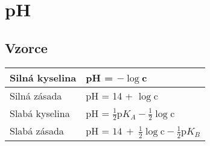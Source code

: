 \documentclass[12pt,a4paper,oneside]{article}
\begin{document}
\section{pH}
\subsection{Vzorce}

\begin{tabular}{|l|l|}
	\hline
	Silná kyselina & pH = $-\log$c \\\hline
	Silná zásada & pH = 14 + $\log$c \\\hline
	Slabá kyselina & pH = $\frac{1}{2}\textrm{p}K_A-\frac{1}{2}\log$c \\[1em] \hline
	Slabá zásada & pH = $14\ +\ \frac{1}{2}\log\textrm{c} - \frac{1}{2}\textrm{p}K_B$ \\[1em] \hline
\end{tabular}
\end{document}
